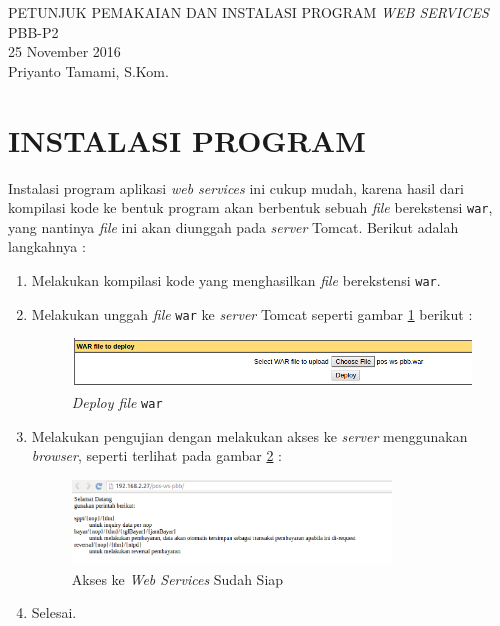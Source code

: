 \documentclass[pdftex,12pt, oneside]{article}
\begin{document}
\sloppy %

\begin{center}
{\large PETUNJUK PEMAKAIAN DAN INSTALASI PROGRAM \textit{WEB SERVICES} PBB-P2}
\\[1cm]
25 November 2016\\
Priyanto Tamami, S.Kom.
\end{center}




\section{INSTALASI PROGRAM}

Instalasi program aplikasi \textit{web services} ini cukup mudah, karena hasil dari kompilasi kode ke bentuk program akan berbentuk sebuah \textit{file} berekstensi \texttt{war}, yang nantinya \textit{file} ini akan diunggah pada \textit{server} Tomcat. Berikut adalah langkahnya :

\begin{enumerate}[1.]
  \item Melakukan kompilasi kode yang menghasilkan \textit{file} berekstensi \texttt{war}.
  \item Melakukan unggah \textit{file} \texttt{war} ke \textit{server} Tomcat seperti gambar \ref{fig:deploy-war} berikut :
  
  \begin{figure}[H]
    \centering
    \includegraphics[width=1\textwidth]{./resources/001-deploy-war}
    \caption{\textit{Deploy file} \texttt{war}}
    \label{fig:deploy-war}
  \end{figure}
  
  \item Melakukan pengujian dengan melakukan akses ke \textit{server} menggunakan \textit{browser}, seperti terlihat pada gambar \ref{fig:ws-worked} :
  
  \begin{figure}[H]
    \centering
    \includegraphics[width=0.8\textwidth]{./resources/002-ws-worked}
    \caption{Akses ke \textit{Web Services} Sudah Siap}
    \label{fig:ws-worked}
  \end{figure}
  
  \item Selesai.
\end{enumerate}
\end{document}
